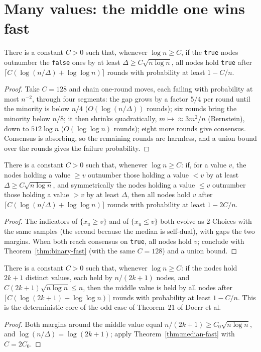 \section{Many values: the middle one wins fast}
\begin{theorem}\label{thm:binary-fast}
\leanok{}
There is a constant $C>0$ such that, whenever $\log n\ge C$, if the \texttt{true} nodes outnumber
the \texttt{false} ones by at least $\Delta\ge C\sqrt{n\log n}$, all nodes hold \texttt{true} after
$\lceil C(\log(n/\Delta)+\log\log n)\rceil$ rounds with probability at least $1-C/n$.
\end{theorem}
\begin{proof}\leanok
Take $C=128$ and chain one-round moves, each failing with probability at most $n^{-2}$, through
four segments: the gap grows by a factor $5/4$ per round until the minority is below $n/4$
($O(\log(n/\Delta))$ rounds); six rounds bring the minority below $n/8$; it then shrinks
quadratically, $m\mapsto\approx 3m^2/n$ (Bernstein), down to $512\log n$ ($O(\log\log n)$
rounds); eight more rounds give consensus. Consensus is absorbing, so the remaining rounds are
harmless, and a union bound over the rounds gives the failure probability.
\end{proof}
\begin{theorem}\label{thm:median-fast}
\leanok{}
There is a constant $C>0$ such that, whenever $\log n\ge C$: if, for a value $v$, the nodes holding a value
$\ge v$ outnumber those holding a value $<v$ by at least $\Delta\ge C\sqrt{n\log n}$, and
symmetrically the nodes holding a value $\le v$ outnumber those holding a value $>v$ by at least
$\Delta$, then all nodes hold $v$ after $\lceil C(\log(n/\Delta)+\log\log n)\rceil$ rounds with
probability at least $1-2C/n$.
\end{theorem}
\begin{proof}\leanok
The indicators of $\{x_u\ge v\}$ and of $\{x_u\le v\}$ both evolve as 2-Choices with the same
samples (the second because the median is self-dual), with gaps the two margins. When both reach
consensus on \texttt{true}, all nodes hold $v$; conclude with Theorem~\ref{thm:binary-fast}
(with the same $C=128$) and a union bound.
\end{proof}
\begin{theorem}\label{thm:odd-split}
\leanok{}
There is a constant $C>0$ such that, whenever $\log n\ge C$: if the nodes hold $2k+1$ distinct
values, each held by $n/(2k+1)$ nodes, and $C(2k+1)\sqrt{n\log n}\le n$, then the middle value is
held by all nodes after $\lceil C(\log(2k+1)+\log\log n)\rceil$ rounds with probability at least
$1-C/n$. This is the deterministic core of the odd case of Theorem~21 of Doerr et al.
\end{theorem}
\begin{proof}\leanok
Both margins around the middle value equal $n/(2k+1)\ge C_0\sqrt{n\log n}$, and
$\log(n/\Delta)=\log(2k+1)$; apply Theorem~\ref{thm:median-fast} with $C=2C_0$.
\end{proof}

